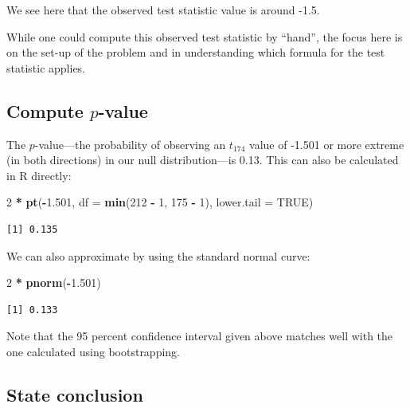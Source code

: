 \documentclass[12pt,]{krantz}
\makeatletter
\newenvironment{Shaded}{\begin{snugshade}}{\end{snugshade}}
\newcommand{\KeywordTok}[1]{\textcolor[rgb]{0.27,0.27,0.27}{\textbf{#1}}}
\newcommand{\DataTypeTok}[1]{\textcolor[rgb]{0.27,0.27,0.27}{#1}}
\newcommand{\DecValTok}[1]{\textcolor[rgb]{0.06,0.06,0.06}{#1}}
\newcommand{\FloatTok}[1]{\textcolor[rgb]{0.06,0.06,0.06}{#1}}
\newcommand{\StringTok}[1]{\textcolor[rgb]{0.5,0.5,0.5}{#1}}
\newcommand{\OtherTok}[1]{\textcolor[rgb]{0.37,0.37,0.37}{#1}}
\newcommand{\OperatorTok}[1]{\textcolor[rgb]{0.43,0.43,0.43}{\textbf{#1}}}
\newcommand{\NormalTok}[1]{#1}
\newenvironment{kframe}{%
\medskip{}
\setlength{\fboxsep}{.8em}
 \def\at@end@of@kframe{}%
 \ifinner\ifhmode%
  \def\at@end@of@kframe{\end{minipage}}%
  \begin{minipage}{\columnwidth}%
 \fi\fi%
 \def\FrameCommand##1{\hskip\@totalleftmargin \hskip-\fboxsep
 \colorbox{shadecolor}{##1}\hskip-\fboxsep
     \hskip-\linewidth \hskip-\@totalleftmargin \hskip\columnwidth}%
 \MakeFramed {\advance\hsize-\width
   \@totalleftmargin\z@ \linewidth\hsize
   \@setminipage}}%
 {\par\unskip\endMakeFramed%
 \at@end@of@kframe}
\renewenvironment{Shaded}{\begin{kframe}}{\end{kframe}}
\theoremstyle{definition}
\theoremstyle{definition}
\theoremstyle{definition}
\theoremstyle{remark}
\makeatother
\begin{document}
We see here that the observed test statistic value is around -1.5.

While one could compute this observed test statistic by ``hand'', the
focus here is on the set-up of the problem and in understanding which
formula for the test statistic applies.

\subsection{\texorpdfstring{Compute
\(p\)-value}{Compute p-value}}\label{compute-p-value-1}

The \(p\)-value---the probability of observing an \(t_{174}\) value of
-1.501 or more extreme (in both directions) in our null
distribution---is 0.13. This can also be calculated in R directly:

\begin{Shaded}
\begin{Highlighting}[]
\DecValTok{2} \OperatorTok{*}\StringTok{ }\KeywordTok{pt}\NormalTok{(}\OperatorTok{-}\FloatTok{1.501}\NormalTok{, }\DataTypeTok{df =} \KeywordTok{min}\NormalTok{(}\DecValTok{212} \OperatorTok{-}\StringTok{ }\DecValTok{1}\NormalTok{, }\DecValTok{175} \OperatorTok{-}\StringTok{ }\DecValTok{1}\NormalTok{), }\DataTypeTok{lower.tail =} \OtherTok{TRUE}\NormalTok{)}
\end{Highlighting}
\end{Shaded}

\begin{verbatim}
[1] 0.135
\end{verbatim}

We can also approximate by using the standard normal curve:

\begin{Shaded}
\begin{Highlighting}[]
\DecValTok{2} \OperatorTok{*}\StringTok{ }\KeywordTok{pnorm}\NormalTok{(}\OperatorTok{-}\FloatTok{1.501}\NormalTok{)}
\end{Highlighting}
\end{Shaded}

\begin{verbatim}
[1] 0.133
\end{verbatim}

Note that the 95 percent confidence interval given above matches well
with the one calculated using bootstrapping.

\subsection{State conclusion}\label{state-conclusion-3}
\end{document}
